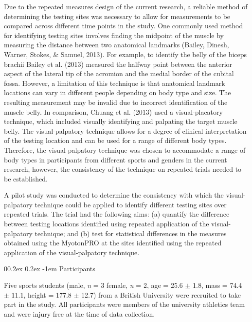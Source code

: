 \documentclass[
  english,
  man,floatsintext]{apa6}
\makeatletter
\renewcommand{\paragraph}{\@startsection{paragraph}{4}{\parindent}%
  {0\baselineskip \@plus 0.2ex \@minus 0.2ex}%
  {-1em}%
  {\normalfont\normalsize\bfseries\itshape\typesectitle}}
\makeatother
\begin{document}
Due to the repeated measures design of the current research, a reliable method of determining the testing sites was necessary to allow for measurements to be compared across different time points in the study.
One commonly used method for identifying testing sites involves finding the midpoint of the muscle by measuring the distance between two anatomical landmarks (Bailey, Dinesh, Warner, Stokes, \& Samuel, 2013).
For example, to identify the belly of the biceps brachii Bailey et al. (2013) measured the halfway point between the anterior aspect of the lateral tip of the acromion and the medial border of the cubital fossa.
However, a limitation of this technique is that anatomical landmark locations can vary in different people depending on body type and size.
The resulting measurement may be invalid due to incorrect identification of the muscle belly.
In comparison, Chuang et al. (2013) used a visual-placatory technique, which included visually identifying and palpating the target muscle belly.
The visual-palpatory technique allows for a degree of clinical interpretation of the testing location and can be used for a range of different body types.
Therefore, the visual-palpatory technique was chosen to accommodate a range of body types in participants from different sports and genders in the current research, however, the consistency of the technique on repeated trials needed to be established.

A pilot study was conducted to determine the consistency with which the visual-palpatory technique could be applied to identify different testing sites over repeated trials.
The trial had the following aims: (a) quantify the difference between testing locations identified using repeated application of the visual-palpatory technique; and (b) test for statistical differences in the measures obtained using the MyotonPRO at the sites identified using the repeated application of the visual-palpatory technique.

\hypertarget{participants}{%
\paragraph{Participants}\label{participants}}

Five sports students (male, \emph{n} = 3 female, \emph{n} = 2, age = 25.6 \(\pm\) 1.8, mass = 74.4 \(\pm\) 11.1, height = 177.8 \(\pm\) 12.7) from a British University were recruited to take part in the study.
All participants were members of the university athletics team and were injury free at the time of data collection.
\end{document}
